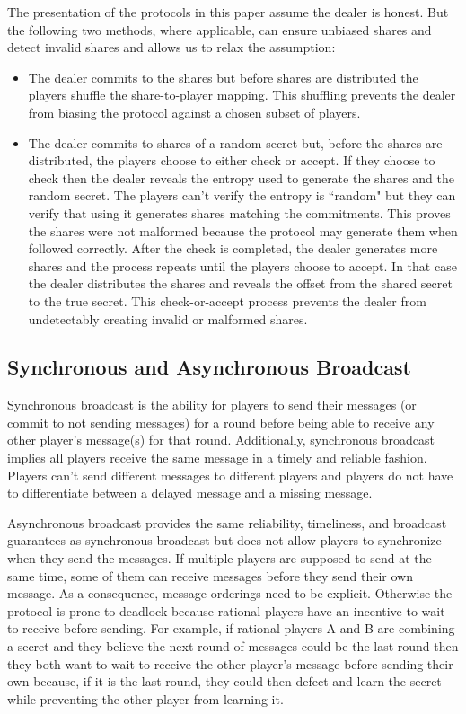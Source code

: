 \documentclass{dalcsthesis}
\begin{document}
The presentation of the protocols in this paper assume the dealer is honest. But the following two methods, where applicable, can ensure unbiased shares and detect invalid shares and allows us to relax the assumption:

\begin{itemize}
  \item The dealer commits to the shares but before shares are distributed the players shuffle the share-to-player mapping. This shuffling prevents the dealer from biasing the protocol against a chosen subset of players.  
  \item The dealer commits to shares of a random secret but, before the shares are distributed, the players choose to either check or accept. If they choose to check then the dealer reveals the entropy used to generate the shares and the random secret. The players can't verify the entropy is ``random" but they can verify that using it generates shares matching the commitments. This proves the shares were not malformed because the protocol may generate them when followed correctly. After the check is completed, the dealer generates more shares and the process repeats until the players choose to accept. In that case the dealer distributes the shares and reveals the offset from the shared secret to the true secret. This check-or-accept process prevents the dealer from undetectably creating invalid or malformed shares.
\end{itemize} 

\subsection{Synchronous and Asynchronous Broadcast}

Synchronous broadcast is the ability for players to send their messages (or commit to not sending messages) for a round before being able to receive any other player's message(s) for that round. Additionally, synchronous broadcast implies all players receive the same message in a timely and reliable fashion. Players can't send different messages to different players and players do not have to differentiate between a delayed message and a missing message. 

Asynchronous broadcast provides the same reliability, timeliness, and broadcast guarantees as synchronous broadcast but does not allow players to synchronize when they send the messages. If multiple players are supposed to send at the same time, some of them can receive messages before they send their own message. As a consequence, message orderings need to be explicit. Otherwise the protocol is prone to deadlock because rational players have an incentive to wait to receive before sending. For example, if rational players A and B are combining a secret and they believe the next round of messages could be the last round then they both want to wait to receive the other player's message before sending their own because, if it is the last round, they could then defect and learn the secret while preventing the other player from learning it. 
\end{document}
